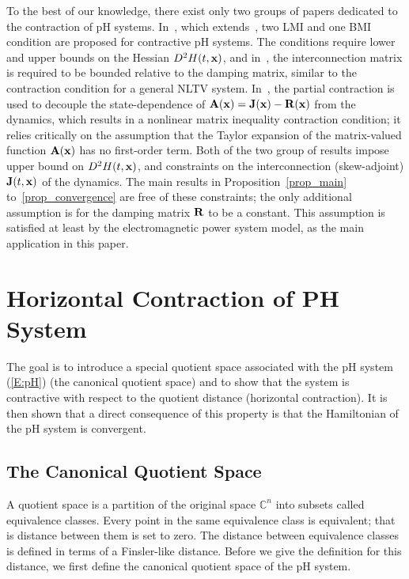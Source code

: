 To the best of our knowledge, there exist only two groups of papers dedicated to the contraction of pH systems. In~\cite{barabanov2019contraction}, which extends~\cite{yaghmaei2017trajectory}, two LMI and one BMI condition are proposed for contractive pH systems. The conditions require lower and upper bounds on the Hessian $D^2 H(t, \mathbf{x})$, and in~\cite[Prop.~3]{barabanov2019contraction}, the interconnection matrix is required to be bounded relative to the damping matrix, similar to the contraction condition for a general NLTV system. In~\cite{yaghmaei2023contractive}, the partial contraction is used to decouple the state-dependence of $\mathbf{A}(\mathbf{x}) = \mathbf{J}(\mathbf{x}) - \mathbf{R}(\mathbf{x})$ from the dynamics, which results in a nonlinear matrix inequality contraction condition; it relies critically on the assumption that the Taylor expansion of the matrix-valued function $\mathbf{A}(\mathbf{x})$ has no first-order term. Both of the two group of results impose upper bound on $D^2 H(t, \mathbf{x})$, and constraints on the interconnection (skew-adjoint) $\mathbf{J}(t, \mathbf{x})$ of the dynamics. The main results in Proposition~\ref{prop_main} to~\ref{prop_convergence} are free of these constraints; the only additional assumption is for the damping matrix $\mathbf{R}$ to be a constant. This assumption is satisfied at least by the electromagnetic power system model, as the main application in this paper.




\section{Horizontal Contraction of PH System} \label{sec_contraction}






The goal is to introduce a special quotient space associated with the pH system (\ref{E:pH}) (the canonical quotient space) and to show that the system is contractive with respect to the quotient distance (horizontal contraction). It is then shown that a direct consequence of this property is that the Hamiltonian of the pH system is convergent.


\subsection{The Canonical Quotient Space}
A quotient space is a partition of the original space $\mathbb{C}^n$ into subsets called equivalence classes. Every point in the same equivalence class is equivalent; that is distance between them is set to zero. The distance between equivalence classes is defined in terms of a Finsler-like distance. Before we give the definition for this distance, we first define the canonical quotient space of the pH system.

